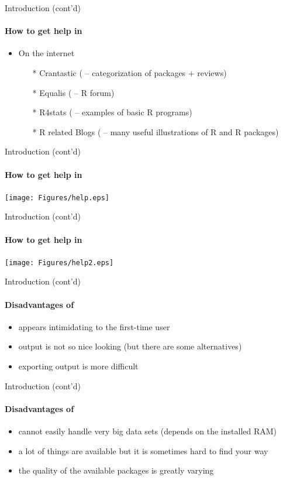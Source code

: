 \documentclass[14pt, aspectratio=169, sectionpage=simple, xclolor=table]{beamer}
\begin{document}
\begin{frame}[fragile]{Introduction (cont'd)}
\framesubtitle{How to get help in \R }
	\begin{itemize}
		\item On the internet
		\begin{itemize}
			\item[*] Crantastic ( -- categorization of
			packages $+$ reviews)
			\item[*] Equalis ( --
			\textsf{R} forum)
			\item[*] R4stats ( -- examples of basic \textsf{R} programs)
			\item[*] R related Blogs ( -- many useful illustrations of \textsf{R} and \textsf{R} packages)	
		\end{itemize}
\end{itemize}
\end{frame}
\begin{frame}[fragile]{ Introduction (cont'd)}
\framesubtitle{How to get help in \R }
\texttt{[image: Figures/help.eps]}
\end{frame}
\begin{frame}[fragile]{ Introduction (cont'd)}
\framesubtitle{How to get help in \R }
\texttt{[image: Figures/help2.eps]}
\end{frame}
\begin{frame}[fragile]{Introduction (cont'd)}
\framesubtitle{Disadvantages of \R}
\begin{itemize}
\item appears intimidating to the first-time user
\item output is not so nice looking (but there are some alternatives)
\item exporting output is more difficult
\end{itemize}
\end{frame}
\begin{frame}[fragile]{Introduction (cont'd)}
\framesubtitle{Disadvantages of \R}
\begin{itemize}
\item cannot easily handle very big data sets (depends on
the installed RAM)
\item a lot of things are available but it is sometimes hard to
find your way
\item the quality of the available packages is greatly varying
\end{itemize}
\end{frame}
\end{document}
